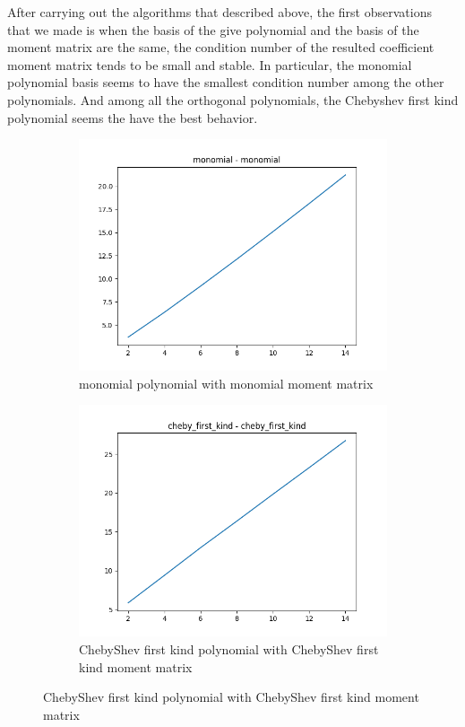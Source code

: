\documentclass[12pt]{amsart}
\numberwithin{equation}{section}
\theoremstyle{definition}
\numberwithin{thm}{section}
\begin{document}
After carrying out the algorithms that described above, the first observations that we made is 
when the basis of the give polynomial and the basis of the moment matrix are the same, 
the condition number of the resulted coefficient moment matrix tends to be small and stable. 
In particular, the monomial polynomial basis seems to have the smallest condition number among the other polynomials.
And among all the orthogonal polynomials, the Chebyshev first kind polynomial seems the have the best behavior.
\begin{figure}[hbt!]
     \centering
     \begin{subfigure}[b]{0.475\textwidth}
         \centering
         \includegraphics[width=\textwidth]{imgs/monomial_monomial.png}
         \caption[Monomial polynomial with monomial moment matrix]%
         {\small monomial polynomial with monomial moment matrix}%

     \end{subfigure}
     \hfill
     \begin{subfigure}[b]{0.475\textwidth}  
         \centering 
         \includegraphics[width=\textwidth]{imgs/cheby_first_kind_cheby_first_kind.png}
         \caption[ChebyShev first kind polynomial with ChebyShev first kind moment matrix]%
         {\small ChebyShev first kind polynomial with ChebyShev first kind moment matrix}%
 

\end{subfigure}
\end{figure}
\end{document}
